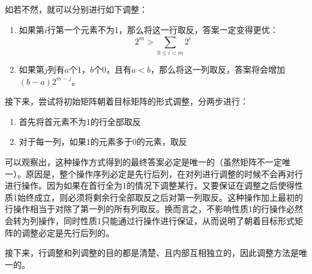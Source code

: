 \documentclass[UTF8]{ctexart}
\begin{document}
        如若不然，就可以分别进行如下调整：
        \begin{enumerate}
            \item 如果第$i$行第一个元素不为1，那么将这一行取反，答案一定变得更优：
            $$2^m>\sum_{0\leq i < m}{2^i}$$
            \item 如果第$j$列有$a$个1，$b$个0，且有$a < b$，那么将这一列取反，答案将会增加$(b-a)2^{m-j}$。
        \end{enumerate}

        接下来，尝试将初始矩阵朝着目标矩阵的形式调整，分两步进行：
        \begin{enumerate}
            \item 首先将首元素不为1的行全部取反
            \item 对于每一列，如果1的元素多于0的元素，取反
        \end{enumerate}

        可以观察出，这种操作方式得到的最终答案必定是唯一的（虽然矩阵不一定唯一）。原因是，整个操作序列必定是先行后列，在对列进行调整的时候不会再对行进行操作。因为如果在首行全为1的情况下调整某行，又要保证在调整之后使得性质1始终成立，则必须将剩余行全部取反之后对第一列取反。这种操作加上最初的行操作相当于对除了第一列的所有列取反。换而言之，不影响性质1的行操作必然会转为列操作，同时性质1只能通过行操作进行保证，从而说明了朝着目标形式矩阵的调整必定是先行后列的。

        接下来，行调整和列调整的目的都是清楚、且内部互相独立的，因此调整方法是唯一的。
\end{document}
